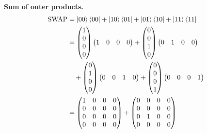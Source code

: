 \documentclass[a4paper, 10pt]{article}
\begin{document}
\begin{solution}
	\noindent \textbf{Sum of outer products.}
	\begin{align*}
		\mathrm{SWAP} & = \ket{00}\bra{00} + \ket{10}\bra{01} + \ket{01}\bra{10} + \ket{11}\bra{11}                       \\
		              & = \begin{pmatrix} 1 \\ 0 \\ 0 \\ 0 \end{pmatrix}\begin{pmatrix} 1 & 0 & 0 & 0 \end{pmatrix}
		+ \begin{pmatrix} 0 \\ 0 \\ 1 \\ 0 \end{pmatrix}\begin{pmatrix} 0 & 1 & 0 & 0 \end{pmatrix}                       \\
		              & \quad + \begin{pmatrix} 0 \\ 1 \\ 0 \\ 0 \end{pmatrix}\begin{pmatrix} 0 & 0 & 1 & 0 \end{pmatrix}
		+ \begin{pmatrix} 0 \\ 0 \\ 0 \\ 1 \end{pmatrix}\begin{pmatrix} 0 & 0 & 0 & 1 \end{pmatrix}                       \\
		              & = \begin{pmatrix}
			                  1 & 0 & 0 & 0 \\
			                  0 & 0 & 0 & 0 \\
			                  0 & 0 & 0 & 0 \\
			                  0 & 0 & 0 & 0
		                  \end{pmatrix}
		+ \begin{pmatrix}
			  0 & 0 & 0 & 0 \\
			  0 & 0 & 0 & 0 \\
			  0 & 1 & 0 & 0 \\
			  0 & 0 & 0 & 0

\end{pmatrix}
\end{align*}
\end{solution}
\end{document}
